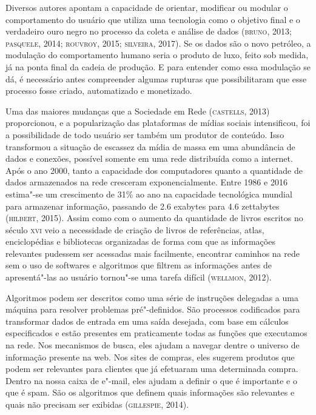 Diversos autores apontam a capacidade de orientar, modificar ou modular
o comportamento do usuário que utiliza uma tecnologia como o objetivo
final e o verdadeiro ouro negro no processo da coleta e análise de dados
(\textsc{bruno}, 2013; \textsc{pasquele}, 2014; \textsc{rouvroy}, 2015; \textsc{silveira}, 2017). Se os dados são o novo petróleo, a modulação do comportamento humano seria o
produto de luxo, feito sob medida, já na ponta final da cadeia de
produção. E para entender como essa modulação se dá, é necessário antes
compreender algumas rupturas que possibilitaram que esse processo fosse
criado, automatizado e monetizado.

Uma das maiores mudanças que a Sociedade em Rede (\textsc{castells}, 2013)
proporcionou, e a popularização das plataformas de mídias sociais
intensificou, foi a possibilidade de todo usuário ser também um produtor
de conteúdo. Isso transformou a situação de escassez da mídia de massa
em uma abundância de dados e conexões, possível somente em uma rede
distribuída como a internet. Após o ano 2000, tanto a capacidade dos
computadores quanto a quantidade de dados armazenados na rede
cresceram exponencialmente. Entre 1986 e 2016 estima"-se um crescimento de
31\% ao ano na capacidade tecnológica mundial para armazenar informação,
passando de 2.6 exabytes para 4.6 zettabytes (\textsc{hilbert}, 2015). Assim como
com o aumento da quantidade de livros escritos no século \textsc{xvi} veio a
necessidade de criação de livros de referências, atlas, enciclopédias e
bibliotecas organizadas de forma com que as informações relevantes
pudessem ser acessadas mais facilmente, encontrar caminhos na rede sem o
uso de softwares e algoritmos que filtrem as informações antes de
apresentá"-las ao usuário tornou"-se uma tarefa difícil (\textsc{wellmon}, 2012).

Algoritmos podem ser descritos como uma série de instruções delegadas a
uma máquina para resolver problemas pré"-definidos. São processos
codificados para transformar dados de entrada em uma saída desejada, com
base em cálculos especificados e estão presentes em praticamente todas
as funções que executamos na rede. Nos mecanismos de busca, eles ajudam
a navegar dentre o universo de informação presente na web. Nos sites de
compras, eles sugerem produtos que podem ser relevantes para clientes
que já efetuaram uma determinada compra. Dentro na nossa caixa de
e"-mail, eles ajudam a definir o que é importante e o que é spam. São os
algoritmos que definem quais informações são relevantes e quais não
precisam ser exibidas (\textsc{gillespie}, 2014).

